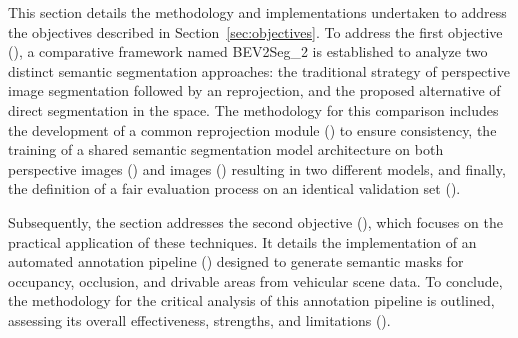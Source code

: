 

This section details the methodology and implementations undertaken to address the objectives described in Section~\ref{sec:objectives}. To address the first objective (), a comparative framework named BEV2Seg\_2 is established to analyze two distinct  semantic segmentation approaches: the traditional strategy of perspective image segmentation followed by an  reprojection, and the proposed alternative of direct segmentation in the  space. The methodology for this comparison includes the development of a common  reprojection module () to ensure consistency, the training of a shared semantic segmentation model architecture on both perspective images () and  images () resulting in two different models, and finally, the definition of a fair evaluation process on an identical validation set ().

Subsequently, the section addresses the second objective (), which focuses on the practical application of these techniques. It details the implementation of an automated annotation pipeline () designed to generate  semantic masks for occupancy, occlusion, and drivable areas from vehicular scene data. To conclude, the methodology for the critical analysis of this annotation pipeline is outlined, assessing its overall effectiveness, strengths, and limitations ().


